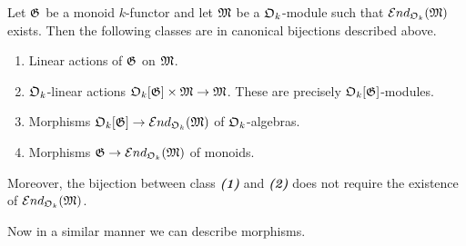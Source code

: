 \begin{proposition}\label{proposition:decription_of_linear_monoid_actions_on_modules}
Let ${\mathfrak G}$ be a monoid $k$-functor and let ${\mathfrak M}$ be a ${\mathfrak O}_k$-module such that ${\mathcal E} nd_{{\mathfrak O}_k}({\mathfrak M})$ exists. Then the following classes are in canonical bijections described above.
\begin{enumerate}[label=\emph{\textbf{(\arabic*)}}, leftmargin=1.5em]
\item Linear actions of ${\mathfrak G}$ on ${\mathfrak M}$.
\item ${\mathfrak O}_k$-linear actions ${\mathfrak O}_k[{\mathfrak G}]\times {\mathfrak M}\rightarrow {\mathfrak M}$. These are precisely ${\mathfrak O}_k[{\mathfrak G}]$-modules.
\item Morphisms ${\mathfrak O}_k[{\mathfrak G}]\rightarrow {\mathcal E} nd_{{\mathfrak O}_k}({\mathfrak M})$ of ${\mathfrak O}_k$-algebras.
\item Morphisms ${\mathfrak G}\rightarrow {\mathcal E} nd_{{\mathfrak O}_k}({\mathfrak M})$ of monoids.
\end{enumerate}
Moreover, the bijection between class \emph{\textbf{(1)}} and \emph{\textbf{(2)}} does not require the existence of ${\mathcal E} nd_{{\mathfrak O}_k}({\mathfrak M})$.
\end{proposition}
\noindent
Now in a similar manner we can describe morphisms.

